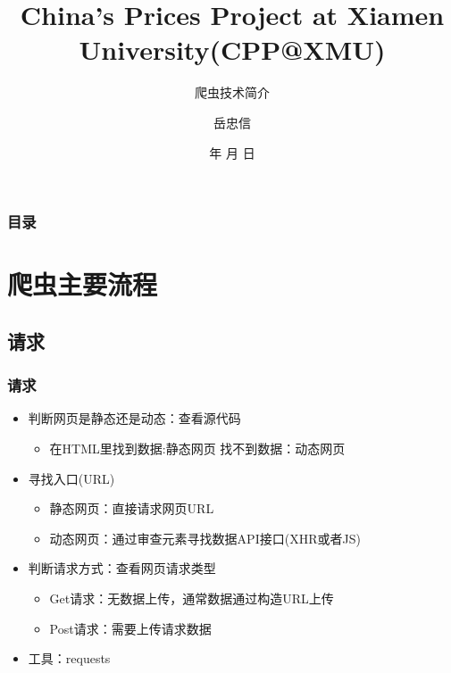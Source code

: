 \documentclass{beamer}
\begin{document}
\title{China's Prices Project at Xiamen University(CPP@XMU)}
\subtitle{爬虫技术简介}

\author{岳忠信}


\renewcommand{\today}{\number\year 年 \number\month 月 \number\day 日}
\date{\today}

\subject{Presentations}

\begin{frame}
\titlepage
\end{frame}

\begin{frame}
\frametitle{目录}
\tableofcontents
\end{frame}


\section{爬虫主要流程}
\subsection{请求}
\begin{frame}
\frametitle{请求}
\begin{itemize}
  \item 判断网页是静态还是动态：查看源代码
  \begin{itemize}
  \item 在HTML里找到数据:静态网页
  \itme 找不到数据：动态网页
  \end{itemize}
  \item 寻找入口(URL)
  \begin{itemize}
    \item 静态网页：直接请求网页URL
    \item 动态网页：通过审查元素寻找数据API接口(XHR或者JS)
  \end{itemize}
  \item 判断请求方式：查看网页请求类型
  \begin{itemize}
    \item Get请求：无数据上传，通常数据通过构造URL上传
    \item Post请求：需要上传请求数据
  \end{itemize}
  \item 工具：requests\footnotemark
\end{itemize}
\end{frame}
\end{document}
